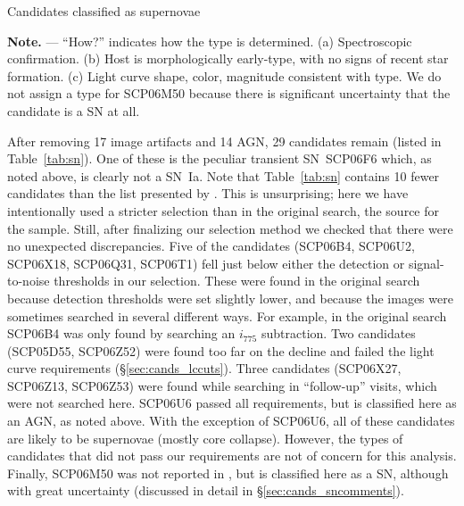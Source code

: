 

\begin{table}[p]
\caption{\label{tab:sn} Candidates classified as supernovae}
\begin{center}

\end{center}
{\footnotesize {\bf Note.} --- ``How?'' indicates how the type is
  determined.  (a) Spectroscopic confirmation.  (b) Host is
  morphologically early-type, with no signs of recent star formation.
  (c) Light curve shape, color, magnitude consistent with type. We do
  not assign a type for SCP06M50 because there is significant
  uncertainty that the candidate is a SN at all.}
\end{table}

After removing 17 image artifacts and 14 AGN, 29 candidates remain
(listed in Table~\ref{tab:sn}). One of these is the peculiar
transient SN~SCP06F6 which, as noted above, is clearly not a SN~Ia.
Note that Table~\ref{tab:sn} contains 10 fewer candidates than the
list presented by \citet{dawson09a}. This is unsurprising; here we have
intentionally used a stricter selection than in the original search,
the source for the \citet{dawson09a} sample. Still, after finalizing our
selection method we checked that there were no unexpected
discrepancies. Five of the \citet{dawson09a} candidates (SCP06B4, SCP06U2,
SCP06X18, SCP06Q31, SCP06T1) fell just below either the detection or
signal-to-noise thresholds in our selection. These were found in the
original search because detection thresholds were set slightly lower,
and because the images were sometimes searched in several different
ways. For example, in the original search SCP06B4 was only found by
searching an $i_{775}$ subtraction. Two \citet{dawson09a} candidates (SCP05D55,
SCP06Z52) were found too far on the decline and failed the light curve
requirements (\S\ref{sec:cands_lccuts}). Three \citet{dawson09a} candidates (SCP06X27,
SCP06Z13, SCP06Z53) were found while searching in ``follow-up''
visits, which were not searched here. SCP06U6 passed all requirements,
but is classified here as an AGN, as noted above. With the exception
of SCP06U6, all of these candidates are likely to be supernovae
(mostly core collapse). However, the types of candidates that did not
pass our requirements are not of concern for this analysis. Finally,
SCP06M50 was not reported in \citet{dawson09a}, but is classified here as a SN,
although with great uncertainty (discussed in detail
in \S\ref{sec:cands_sncomments}).

